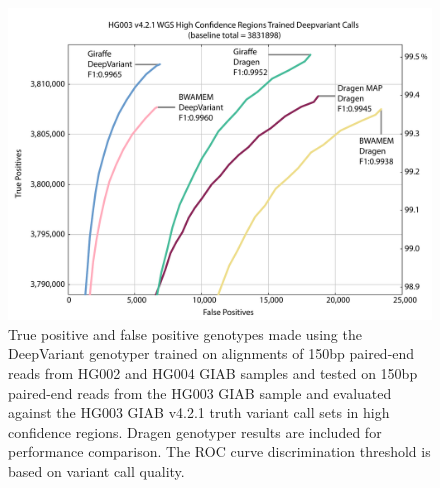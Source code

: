 \documentclass[11pt]{ucscthesis}
\begin{document}
\begin{figure}[H]
    \centering
    \includegraphics[width=\linewidth]{HG003_trained_deepvariant_genotyping.pdf}
    \caption[Genotyping evaluation for the DeepVariant genotyper with projected mappings from Giraffe and other mappers]{True positive and false positive genotypes made using the DeepVariant genotyper trained on alignments of 150bp paired-end reads from HG002 and HG004 GIAB samples and tested on 150bp paired-end reads from the HG003 GIAB sample and evaluated against the HG003 GIAB v4.2.1 truth variant call sets in high confidence regions. Dragen genotyper results are included for performance comparison. The ROC curve discrimination threshold is based on variant call quality.}
    \label{fig:trained_deepvariant_genotyping}
\end{figure}
\end{document}
